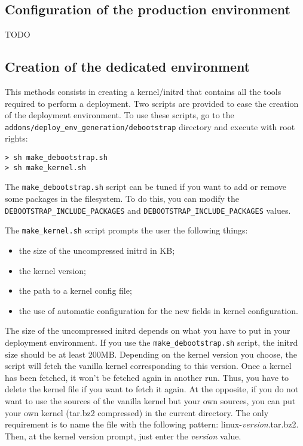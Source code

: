 \documentclass[a4wide,10pt,oneside]{book}
\begin{document}
\subsection{Configuration of the production environment}
TODO
\subsection{Creation of the dedicated environment}
This methods consists in creating a kernel/initrd that contains all the tools required to perform a deployment. Two scripts are provided to ease the creation of the deployment environment. To use these scripts, go to the \texttt{addons/deploy\_env\_generation/debootstrap} directory and execute with root rights:
\begin{small}
\begin{verbatim}
> sh make_debootstrap.sh
> sh make_kernel.sh
\end{verbatim}
\end{small}

The \texttt{make\_debootstrap.sh} script can be tuned if you want to add or remove some packages in the filesystem. To do this, you can modify the \texttt{DEBOOTSTRAP\_INCLUDE\_PACKAGES} and \texttt{DEBOOTSTRAP\_INCLUDE\_PACKAGES} values.

The \texttt{make\_kernel.sh} script prompts the user the following things:
\begin{itemize}
\item the size of the uncompressed initrd in KB;
\item the kernel version;
\item the path to a kernel config file;
\item the use of automatic configuration for the new fields in kernel configuration.
\end{itemize}

The size of the uncompressed initrd depends on what you have to put in your deployment environment. If you use the \texttt{make\_debootstrap.sh} script, the initrd size should be at least 200MB.
Depending on the kernel version you choose, the script will fetch the vanilla kernel corresponding to this version. Once a kernel has been fetched, it won't be fetched again in another run. Thus, you have to delete the kernel file if you want to fetch it again. At the opposite, if you do not want to use the sources of the vanilla kernel but your own sources, you can put your own kernel (tar.bz2 compressed) in the current directory. The only requirement is to name the file with the following pattern: linux-\textit{version}.tar.bz2. Then, at the kernel version prompt, just enter the \textit{version} value.
\end{document}
